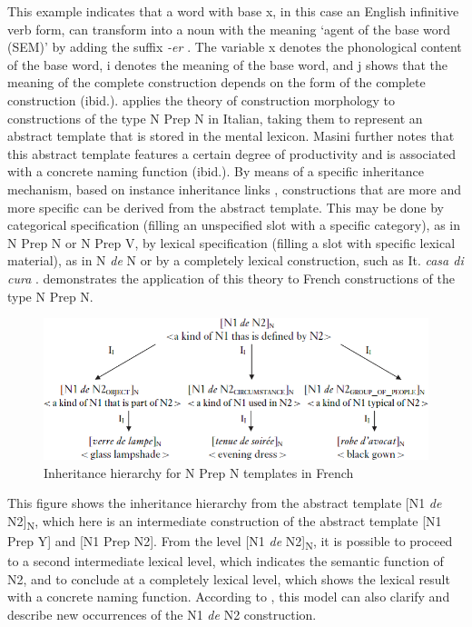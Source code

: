 \documentclass[output=paper]{langsci/langscibook}
\begin{document}
This example indicates that a word with base x, in this case an English infinitive verb form, can transform into a noun with the meaning `agent of the base word (SEM)' by adding the suffix \textit{-er} \citep[2]{Booij:2015}. The variable x denotes the phonological content of the base word, i denotes the meaning of the base word, and j shows that the meaning of the complete construction depends on the form of the complete construction (ibid.). \citet[261]{Masini:2009} applies the theory of construction morphology to constructions of the type N Prep N in Italian, taking them to represent an abstract template that is stored in the mental lexicon. Masini further notes that this abstract template features a certain degree of productivity and is associated with a concrete naming function (ibid.). By means of a specific inheritance mechanism, based on instance inheritance links \citep{Goldberg:1995}, constructions that are more and more specific can be derived from the abstract template. This may be done by categorical specification (filling an unspecified slot with a specific category), as in N Prep N or N Prep V, by lexical specification (filling a slot with specific lexical material), as in N \textit{de} N or by a completely lexical construction, such as It. \textit{casa di cura} \citep[261]{Masini:2009}.  demonstrates the application of this theory to French constructions of the type N Prep N.

\begin{figure}
\caption{Inheritance hierarchy for N Prep N templates in French \citep[263]{Masini:2009}\label{fig:hen:1}}
\includegraphics[scale=0.5]{figures/Masinifigure2.png} 
\end{figure}

This figure shows the inheritance hierarchy from the abstract template [N1 \textit{de} N2]\textsubscript{N}, which here is an intermediate construction of the abstract template [N1 Prep Y] and [N1 Prep N2]. From the level [N1 \textit{de} N2]\textsubscript{N}, it is possible to proceed to a second intermediate lexical level, which indicates the semantic function of N2, and to conclude at a completely lexical level, which shows the lexical result with a concrete naming function. According to \citet[263]{Masini:2009}, this model can also clarify and describe new occurrences of the N1 \textit{de} N2 construction. 
\end{document}

